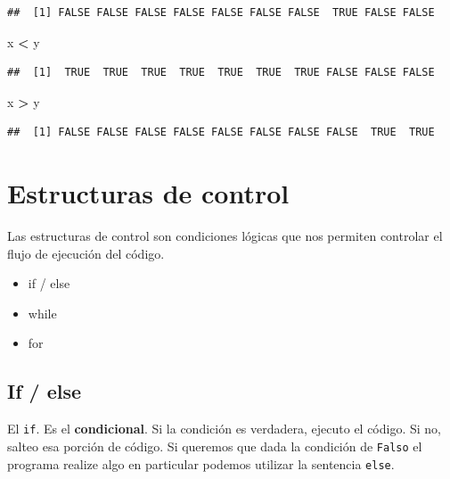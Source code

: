 \documentclass[spanish,]{book}
\newenvironment{Shaded}{\begin{snugshade}}{\end{snugshade}}
\newcommand{\StringTok}[1]{\textcolor[rgb]{0.31,0.60,0.02}{#1}}
\newcommand{\OperatorTok}[1]{\textcolor[rgb]{0.81,0.36,0.00}{\textbf{#1}}}
\newcommand{\NormalTok}[1]{#1}
\providecommand{\tightlist}{%
  \setlength{\itemsep}{0pt}\setlength{\parskip}{0pt}}
\begin{document}
\begin{verbatim}
##  [1] FALSE FALSE FALSE FALSE FALSE FALSE FALSE  TRUE FALSE FALSE
\end{verbatim}

\begin{Shaded}
\begin{Highlighting}[]
\NormalTok{x }\OperatorTok{<}\StringTok{ }\NormalTok{y}
\end{Highlighting}
\end{Shaded}

\begin{verbatim}
##  [1]  TRUE  TRUE  TRUE  TRUE  TRUE  TRUE  TRUE FALSE FALSE FALSE
\end{verbatim}

\begin{Shaded}
\begin{Highlighting}[]
\NormalTok{x }\OperatorTok{>}\StringTok{ }\NormalTok{y}
\end{Highlighting}
\end{Shaded}

\begin{verbatim}
##  [1] FALSE FALSE FALSE FALSE FALSE FALSE FALSE FALSE  TRUE  TRUE
\end{verbatim}

\chapter{Estructuras de control}\label{estructuras-de-control}

Las estructuras de control son condiciones lógicas que nos permiten
controlar el flujo de ejecución del código.

\begin{itemize}
\tightlist
\item
  if / else
\item
  while
\item
  for
\end{itemize}

\section{If / else}\label{if-else}

El \texttt{if}. Es el \textbf{condicional}. Si la condición es
verdadera, ejecuto el código. Si no, salteo esa porción de código. Si
queremos que dada la condición de \texttt{Falso} el programa realize
algo en particular podemos utilizar la sentencia \texttt{else}.
\end{document}

